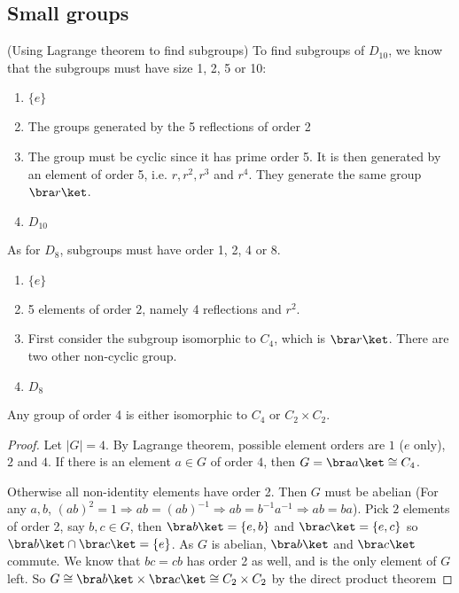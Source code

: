 \documentclass[a4paper]{article}
\begin{document}
  \subsection{Small groups}
  \begin{eg}
    (Using Lagrange theorem to find subgroups) To find subgroups of $D_{10}$, we know that the subgroups must have size 1, 2, 5 or 10:
    \begin{enumerate}[label=\arabic{*}:]
      \item $\{e\}$
      \item The groups generated by the 5 reflections of order 2
        \setcounter{enumi}{4}
      \item The group must be cyclic since it has prime order 5. It is then generated by an element of order 5, i.e. $r, r^2, r^3$ and $r^4$. They generate the same group $\bra r\ket$.
        \setcounter{enumi}{9}
      \item $D_{10}$
    \end{enumerate}

    As for $D_8$, subgroups must have order 1, 2, 4 or 8.
    \begin{enumerate}[label=\arabic{*}:]
      \item $\{e\}$
      \item 5 elements of order $2$, namely 4 reflections and $r^2$.
        \setcounter{enumi}{3}
      \item First consider the subgroup isomorphic to $C_4$, which is $\bra r\ket$. There are two other non-cyclic group.
        \setcounter{enumi}{7}
      \item $D_8$
    \end{enumerate}
  \end{eg}

  \begin{prop}
    Any group of order 4 is either isomorphic to $C_4$ or $C_2\times C_2$.
  \end{prop}

  \begin{proof}
    Let $|G| = 4$. By Lagrange theorem, possible element orders are $1$ ($e$ only), $2$ and $4$. If there is an element $a\in G$ of order $4$, then $G = \bra a\ket \cong C_4$.

    Otherwise all non-identity elements have order 2. Then $G$ must be abelian (For any $a, b$, $(ab)^2 = 1 \Rightarrow ab = (ab)^{-1} \Rightarrow ab = b^{-1}a^{-1} \Rightarrow ab = ba$).
    Pick $2$ elements  of order 2, say $b, c\in G$, then $\bra b\ket=\{e, b\}$ and $\bra c\ket = \{e, c\}$ so $\bra b\ket\cap \bra c\ket = \{e\}$. As $G$ is abelian, $\bra b\ket$ and $\bra c\ket$ commute. We know that $bc = cb$ has order 2 as well, and is the only element of $G$ left. So $G \cong \bra b\ket\times \bra c\ket \cong C_2\times C_2$ by the direct product theorem
  \end{proof}
\end{document}
